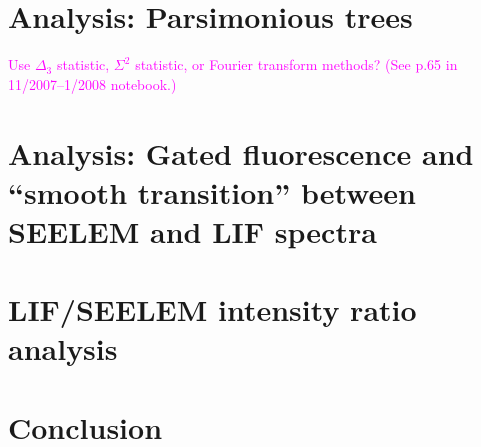 \documentclass[12pt]{mitthesis}
\newcommand{\POINT}[1]{\textcolor{magenta}{#1}}
\begin{document}
\section{Analysis: Parsimonious trees}

\POINT{Use $\Delta_3$ statistic, $\Sigma^2$ statistic, or Fourier
  transform methods? (See p.65 in 11/2007--1/2008 notebook.)}

\section{Analysis: Gated fluorescence and ``smooth transition''
  between SEELEM and LIF spectra}

\section{LIF/SEELEM intensity ratio analysis}

\section{Conclusion}
\end{document}

